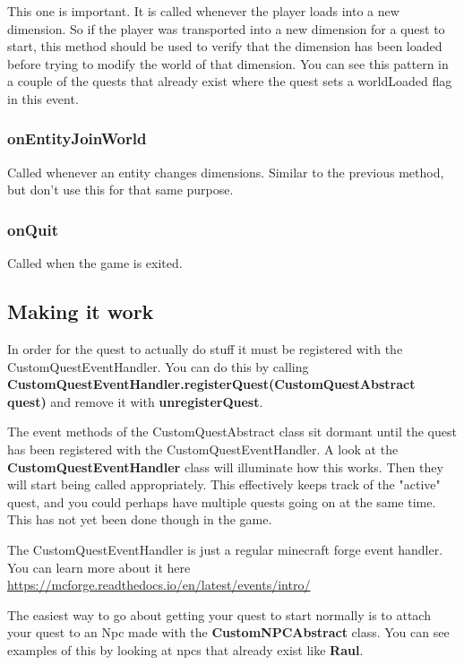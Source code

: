 \documentclass[12pt]{article}
\begin{document}
This one is important. It is called whenever the player loads into a new dimension. So if the player was transported into a new dimension for a quest to start, this method should be used to verify that the dimension has been loaded before trying to modify the world of that dimension. You can see this pattern in a couple of the quests that already exist where the quest sets a worldLoaded flag in this event.

\subsubsection{onEntityJoinWorld}

Called whenever an entity changes dimensions. Similar to the previous method, but don't use this for that same purpose.

\subsubsection{onQuit}

Called when the game is exited.


\subsection{Making it work}
In order for the quest to actually do stuff it must be registered with the CustomQuestEventHandler. You can do this by calling {\bfseries CustomQuestEventHandler.registerQuest(CustomQuestAbstract quest)} and remove it with {\bfseries unregisterQuest}.

The event methods of the CustomQuestAbstract class sit dormant until the quest has been registered with the CustomQuestEventHandler. A look at the {\bfseries CustomQuestEventHandler} class will illuminate how this works. Then they will start being called appropriately. This effectively keeps track of the "active" quest, and you could perhaps have multiple quests going on at the same time. This has not yet been done though in the game.

The CustomQuestEventHandler is just a regular minecraft forge event handler. You can learn more about it here \url{https://mcforge.readthedocs.io/en/latest/events/intro/}

The easiest way to go about getting your quest to start normally is to attach your quest to an Npc made with the {\bfseries CustomNPCAbstract} class. You can see examples of this by looking at npcs that already exist like {\bfseries Raul}.
\end{document}
